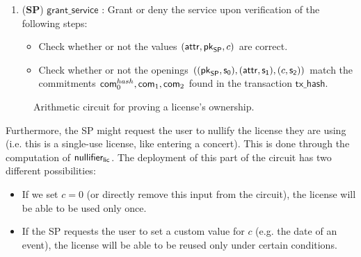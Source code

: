 \begin{enumerate}
	\item (\textbf{SP}) $\mathsf{grant\_service}$ : Grant or deny the service upon verification of the following steps:

	\begin{itemize}
		\item Check whether or not the values $(\mathsf{attr}, \mathsf{pk}_{\mathsf{SP}}, c)$ are correct.
		\item Check whether or not the openings $((\mathsf{pk}_{\mathsf{SP}}, \mathsf{s_0}), (\mathsf{attr}, \mathsf{s_1}), (c, \mathsf{s_2}))$ match the commitments $\mathsf{com}_0^{hash}, \mathsf{com}_1, \mathsf{com}_2$ found in the transaction $\mathsf{tx\_hash}$.
	\end{itemize}

\end{enumerate}

\begin{figure}[h]
	\centering
	\setlength{\fboxsep}{5pt}%
	\setlength{\fboxrule}{0.3pt}%
	\caption{Arithmetic circuit for proving a license's ownership.}
	\label{fig:circuit_prove_nft}
\end{figure}

Furthermore, the SP might request the user to nullify the license they are using (i.e. this is a single-use license, like entering a concert). This is done through the computation of $\mathsf{nullifier_{lic}}$. The deployment of this part of the circuit has two different possibilities:
\begin{itemize}
	\item If we set $c = 0$ (or directly remove this input from the circuit), the license will be able to be used only once.
	\item If the SP requests the user to set a custom value for $c$ (e.g. the date of an event), the license will be able to be reused only under certain conditions.
\end{itemize}
